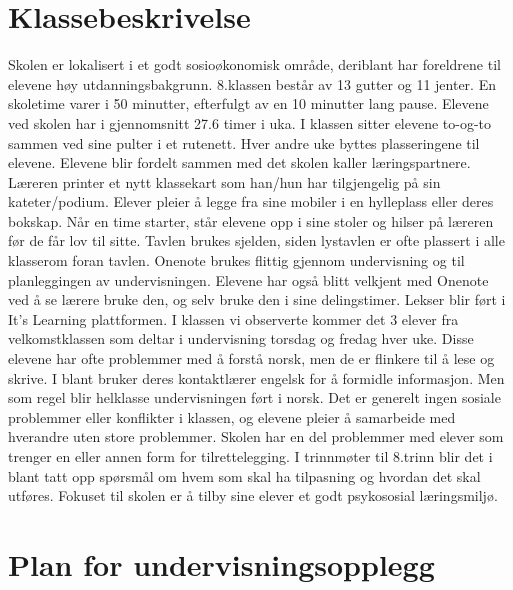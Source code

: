 \documentclass[main.tex]{subfiles}
\begin{document}
\appendix
\section{Klassebeskrivelse}
Skolen er lokalisert i et godt sosioøkonomisk område, deriblant har foreldrene til elevene høy
utdanningsbakgrunn. 8.klassen består av 13 gutter og 11 jenter. En skoletime varer i 50
minutter, efterfulgt av en 10 minutter lang pause. Elevene ved skolen har i gjennomsnitt 27.6
timer i uka. I klassen sitter elevene to-og-to sammen ved sine pulter i et rutenett. Hver andre
uke byttes plasseringene til elevene. Elevene blir fordelt sammen med det skolen kaller
læringspartnere. Læreren printer et nytt klassekart som han/hun har tilgjengelig på sin
kateter/podium. Elever pleier å legge fra sine mobiler i en hylleplass eller deres bokskap. Når en
time starter, står elevene opp i sine stoler og hilser på læreren før de får lov til sitte. Tavlen
brukes sjelden, siden lystavlen er ofte plassert i alle klasserom foran tavlen. Onenote brukes
flittig gjennom undervisning og til planleggingen av undervisningen. Elevene har også blitt
velkjent med Onenote ved å se lærere bruke den, og selv bruke den i sine delingstimer. Lekser
blir ført i It’s Learning plattformen. I klassen vi observerte kommer det 3 elever fra
velkomstklassen som deltar i undervisning torsdag og fredag hver uke. Disse elevene har ofte
problemmer med å forstå norsk, men de er flinkere til å lese og skrive. I blant bruker deres
kontaktlærer engelsk for å formidle informasjon. Men som regel blir helklasse undervisningen
ført i norsk. Det er generelt ingen sosiale problemmer eller konflikter i klassen, og elevene pleier
å samarbeide med hverandre uten store problemmer. Skolen har en del problemmer med
elever som trenger en eller annen form for tilrettelegging. I trinnmøter til 8.trinn blir det i blant tatt
opp spørsmål om hvem som skal ha tilpasning og hvordan det skal utføres. Fokuset til skolen er
å tilby sine elever et godt psykososial læringsmiljø.

\section{Plan for undervisningsopplegg}
\end{document}
